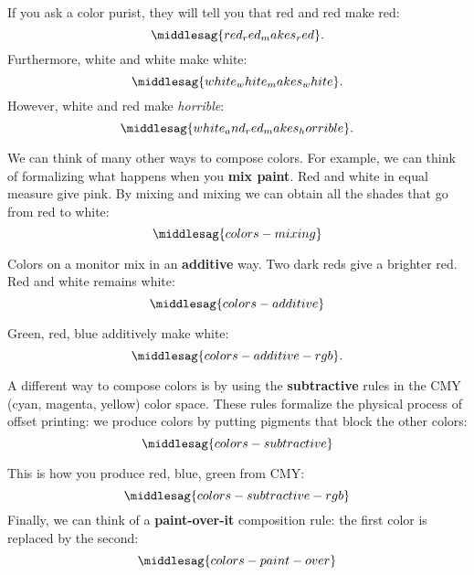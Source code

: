 If you ask a color purist, they will tell you that red and red make red:
%
\begin{equation}
    \middlesag{red_red_makes_red}.
\end{equation}
%
Furthermore, white and white make white:
%
\begin{equation}
    \middlesag{white_white_makes_white}.
\end{equation}
%
However, white and red make \emph{horrible}:
%
\begin{equation}
    \middlesag{white_and_red_makes_horrible}.
\end{equation}


We can think of many other ways to compose colors.
For example, we can think of formalizing what happens when you \textbf{mix paint}.
Red and white in equal measure give pink.
By mixing and mixing we can obtain all the shades that go from red to white:
\begin{equation}
    \label{eq:colors-mixing}
    \middlesag{colors-mixing}
\end{equation}

Colors on a monitor mix in an \textbf{additive} way.
Two dark reds give a brighter red.
Red and white remains white:
%
\begin{equation}
    \label{eq:colors-additive}
    \middlesag{colors-additive} %
\end{equation}

Green, red, blue additively make white:
\begin{equation}
    \label{eq:colors-additive-rgb}
    \middlesag{colors-additive-rgb}.
\end{equation}

A different way to compose colors is by using the \textbf{subtractive} rules in the CMY (cyan, magenta, yellow) color space.
These rules formalize the physical process of offset printing: we produce colors by putting pigments that block the other colors:
\begin{equation}
    \label{eq:colors_subtractive}
    \middlesag{colors-subtractive}
\end{equation}

This is how you produce red, blue, green from CMY:
%
\begin{equation}
    \label{eq:colors-subtractive-rgb}
    \middlesag{colors-subtractive-rgb}
\end{equation}
%
Finally, we can think of a \textbf{paint-over-it} composition rule: the first color is replaced by the second:
%
\begin{equation}
    \label{eq:colors-paint-over}
    \middlesag{colors-paint-over}
\end{equation}

